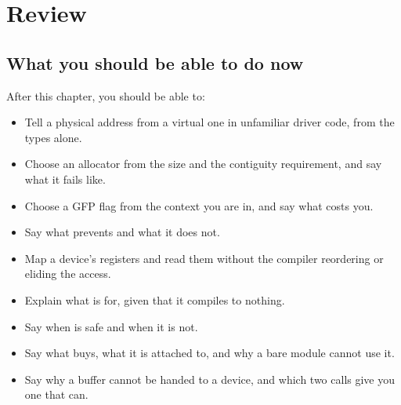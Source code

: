 
\section{Review}
\label{c6:sec:review}

\subsection*{What you should be able to do now}
After this chapter, you should be able to:
\begin{itemize}
  \item Tell a physical address from a virtual one in unfamiliar driver code, from the types alone.
  \item Choose an allocator from the size and the contiguity requirement, and say what it fails
    like.
  \item Choose a GFP flag from the context you are in, and say what  costs you.
  \item Say what  prevents and what it does not.
  \item Map a device's registers and read them without the compiler reordering or eliding the
    access.
  \item Explain what  is for, given that it compiles to nothing.
  \item Say when  is safe and when it is not.
  \item Say what  buys, what it is attached to, and why a bare module cannot use it.
  \item Say why a  buffer cannot be handed to a device, and which two calls give you
    one that can.
\end{itemize}

